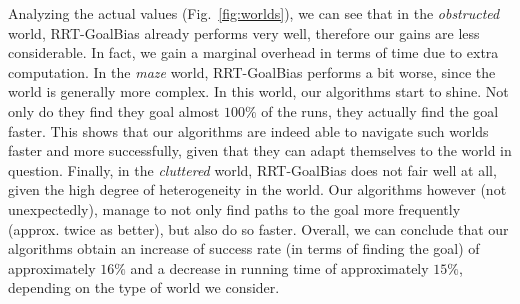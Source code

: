 \documentclass[10pt,twoside,twocolumn]{article}
\begin{document}
Analyzing the actual values (Fig.~\ref{fig:worlds}), we can see that in the \emph{obstructed}
world, RRT-GoalBias already performs very well, therefore our gains
are less considerable. In fact, we gain a marginal overhead in terms
of time due to extra computation. In the \emph{maze} world,
RRT-GoalBias performs a bit worse, since the world is generally more
complex. In this world, our algorithms start to shine. Not only do
they find they goal almost $100\%$ of the runs, they actually find the
goal faster. This shows that our algorithms are indeed able to
navigate such worlds faster and more successfully, given that they can
adapt themselves to the world in question.
Finally, in the \emph{cluttered} world, RRT-GoalBias does not fair
well at all, given the high degree of heterogeneity in the world. Our
algorithms however (not unexpectedly), 
manage to not only find paths to the goal more frequently
(approx. twice as better), but also do so faster. 
Overall, we can conclude that our algorithms obtain an increase
of success rate (in terms of finding the goal) of approximately
$16\%$ and a decrease in running time of approximately $15\%$,
depending on the type of world we consider.

\end{document}
